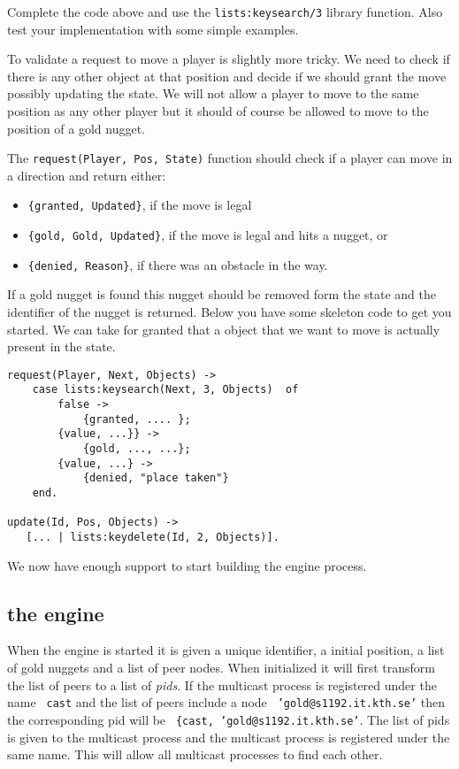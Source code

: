 \documentclass[a4paper,11pt]{article}
\begin{document}
Complete the code above and use the {\tt lists:keysearch/3} library
function. Also test your implementation with some simple examples.

To validate a request to move a player is slightly more tricky. We
need to check if there is any other object at that position and decide
if we should grant the move possibly updating the state. We will not
allow a player to move to the same position as any other player but it
should of course be allowed to move to the position of a gold
nugget. 

The {\tt request(Player, Pos, State)} function should check if a player
can move in a direction and return either:

\begin{itemize}
\item {\tt \{granted, Updated\}}, if the move is legal
\item {\tt \{gold, Gold, Updated\}}, if the move is legal and hits a nugget, or
\item {\tt \{denied, Reason\}}, if there was an obstacle in the way.
\end{itemize}

If a gold nugget is found this nugget should be removed form the state
and the identifier of the nugget is returned. Below you have some
skeleton code to get you started. We can take for granted that a
object that we want to move is actually present in the state.

\begin{verbatim}
request(Player, Next, Objects) ->
    case lists:keysearch(Next, 3, Objects)  of
        false -> 
            {granted, .... };
        {value, ...}} ->
            {gold, ..., ...};
        {value, ...} ->
            {denied, "place taken"}
    end.

update(Id, Pos, Objects) ->
   [... | lists:keydelete(Id, 2, Objects)].
\end{verbatim}

We now have enough support to start building the engine process. 


\subsection{the engine}

When the engine is started it is given a unique identifier, a initial
position, a list of gold nuggets and a list of peer nodes. When
initialized it will first transform the list of peers to a list of
{\it pids}. If the multicast process is registered under the name {\tt
cast} and the list of peers include a node {\tt
'gold@s1192.it.kth.se'} then the corresponding pid will be {\tt
\{cast, 'gold@s1192.it.kth.se'}. The list of pids is given to the
multicast process and the multicast process is registered under the
same name. This will allow all multicast processes to find each other.
\end{document}
